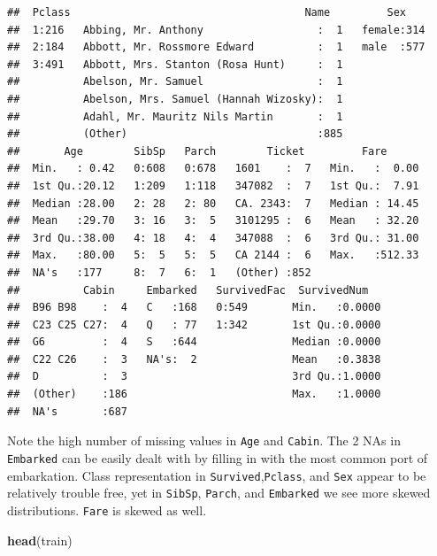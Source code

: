 \documentclass[]{article}
\newenvironment{Shaded}{\begin{snugshade}}{\end{snugshade}}
\newcommand{\KeywordTok}[1]{\textcolor[rgb]{0.13,0.29,0.53}{\textbf{#1}}}
\newcommand{\NormalTok}[1]{#1}
\begin{document}
\begin{verbatim}
##  Pclass                                     Name         Sex     
##  1:216   Abbing, Mr. Anthony                  :  1   female:314  
##  2:184   Abbott, Mr. Rossmore Edward          :  1   male  :577  
##  3:491   Abbott, Mrs. Stanton (Rosa Hunt)     :  1               
##          Abelson, Mr. Samuel                  :  1               
##          Abelson, Mrs. Samuel (Hannah Wizosky):  1               
##          Adahl, Mr. Mauritz Nils Martin       :  1               
##          (Other)                              :885               
##       Age        SibSp   Parch        Ticket         Fare       
##  Min.   : 0.42   0:608   0:678   1601    :  7   Min.   :  0.00  
##  1st Qu.:20.12   1:209   1:118   347082  :  7   1st Qu.:  7.91  
##  Median :28.00   2: 28   2: 80   CA. 2343:  7   Median : 14.45  
##  Mean   :29.70   3: 16   3:  5   3101295 :  6   Mean   : 32.20  
##  3rd Qu.:38.00   4: 18   4:  4   347088  :  6   3rd Qu.: 31.00  
##  Max.   :80.00   5:  5   5:  5   CA 2144 :  6   Max.   :512.33  
##  NA's   :177     8:  7   6:  1   (Other) :852                   
##          Cabin     Embarked   SurvivedFac  SurvivedNum    
##  B96 B98    :  4   C   :168   0:549       Min.   :0.0000  
##  C23 C25 C27:  4   Q   : 77   1:342       1st Qu.:0.0000  
##  G6         :  4   S   :644               Median :0.0000  
##  C22 C26    :  3   NA's:  2               Mean   :0.3838  
##  D          :  3                          3rd Qu.:1.0000  
##  (Other)    :186                          Max.   :1.0000  
##  NA's       :687
\end{verbatim}

Note the high number of missing values in \texttt{Age} and
\texttt{Cabin}. The 2 NAs in \texttt{Embarked} can be easily dealt with
by filling in with the most common port of embarkation. Class
representation in \texttt{Survived},\texttt{Pclass}, and \texttt{Sex}
appear to be relatively trouble free, yet in \texttt{SibSp},
\texttt{Parch}, and \texttt{Embarked} we see more skewed distributions.
\texttt{Fare} is skewed as well.

\begin{Shaded}
\begin{Highlighting}[]
\KeywordTok{head}\NormalTok{(train)}
\end{Highlighting}
\end{Shaded}
\end{document}
